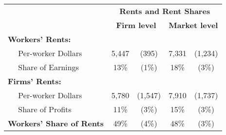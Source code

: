 \begin{tabular}{lcccc}
\toprule 
\midrule 
  & \multicolumn{4}{c}{\textbf{Rents and Rent Shares}} \\
 \cmidrule(lr){2-5} 
 & \multicolumn{2}{c}{\textbf{Firm level}} & \multicolumn{2}{c}{\textbf{Market level}} \\
 \cmidrule(lr){2-3} \cmidrule(lr){4-5} 
\textbf{Workers' Rents:} \\
$\quad$ Per-worker Dollars & 5,447 & (395) & 7,331 & (1,234) \\
$\quad$ Share of Earnings & 13\% & (1\%) & 18\% & (3\%) \\[5pt]
\textbf{Firms' Rents:} \\
$\quad$ Per-worker Dollars & 5,780 & (1,547) & 7,910 & (1,737) \\
$\quad$ Share of Profits & 11\% & (3\%) & 15\% & (3\%) \\[10pt]
\textbf{Workers' Share of Rents} & 49\% & (4\%) & 48\% & (3\%) \\[5pt]
\midrule 
\bottomrule 
\end{tabular}
